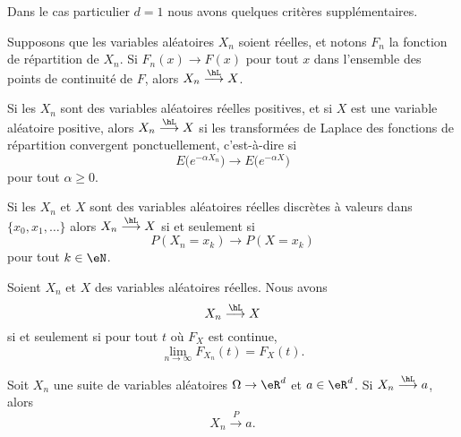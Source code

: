 Dans le cas particulier \( d=1\) nous avons quelques critères supplémentaires.

\begin{proposition}     \label{PropoFnrepCvL}
	Supposons que les variables aléatoires \( X_n\) soient réelles, et notons \( F_n\) la fonction de répartition de \( X_n\). Si \( F_n(x)\to F(x)\) pour tout \( x\) dans l'ensemble des points de continuité de \( F\), alors \( X_n\stackrel{\hL}{\longrightarrow}X\).
\end{proposition}

\begin{proposition}
	Si les \( X_n\) sont des variables aléatoires réelles positives, et si \( X\) est une variable aléatoire positive, alors \( X_n\stackrel{\hL}{\longrightarrow}X\) si les transformées de Laplace des fonctions de répartition convergent ponctuellement, c'est-à-dire si
	\begin{equation}
		E\big(  e^{-\alpha X_n} \big)\to E\big(  e^{-\alpha X} \big)
	\end{equation}
	pour tout \( \alpha\geq 0\).
\end{proposition}

\begin{proposition}
	Si les \( X_n\) et \( X\) sont des variables aléatoires réelles discrètes à valeurs dans \( \{ x_0,x_1,\ldots \}\) alors \( X_n\stackrel{\hL}{\longrightarrow} X\) si et seulement si
	\begin{equation}
		P(X_n=x_k)\to P(X=x_k)
	\end{equation}
	pour tout \( k\in\eN\).
\end{proposition}

\begin{proposition}     \label{PropXncvXFXcvFxt}
	Soient \( X_n\) et \( X\) des variables aléatoires réelles. Nous avons
	\begin{equation}
		X_n\stackrel{\hL}{\longrightarrow}X
	\end{equation}
	si et seulement si pour tout \( t\) où \( F_X\) est continue,
	\begin{equation}
		\lim_{n\to \infty} F_{X_n}(t)=F_X(t).
	\end{equation}
\end{proposition}

\begin{proposition}     \label{PropCvLfcvPsicst}
	Soit \( X_n\) une suite de variables aléatoires \( \Omega\to \eR^d\) et \( a\in\eR^d\). Si \( X_n\stackrel{\hL}{\longrightarrow}a\), alors
	\begin{equation}
		X_n\stackrel{P}{\longrightarrow}a.
	\end{equation}
\end{proposition}

